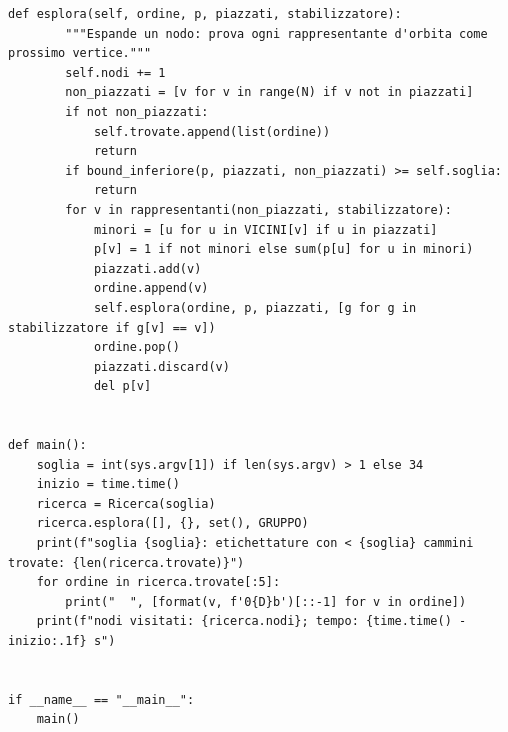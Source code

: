 \documentclass[11pt,a4paper]{article}
\begin{document}
\begin{lstlisting}[caption={attempt\_001 code\_2 [python, rigore exact] — Independent exact confirmation of the lower bound: symmetry-reduced branch-and-bound over  — verdetto del Referee: (nessun verdetto)}]
    def esplora(self, ordine, p, piazzati, stabilizzatore):
        """Espande un nodo: prova ogni rappresentante d'orbita come prossimo vertice."""
        self.nodi += 1
        non_piazzati = [v for v in range(N) if v not in piazzati]
        if not non_piazzati:
            self.trovate.append(list(ordine))
            return
        if bound_inferiore(p, piazzati, non_piazzati) >= self.soglia:
            return
        for v in rappresentanti(non_piazzati, stabilizzatore):
            minori = [u for u in VICINI[v] if u in piazzati]
            p[v] = 1 if not minori else sum(p[u] for u in minori)
            piazzati.add(v)
            ordine.append(v)
            self.esplora(ordine, p, piazzati, [g for g in stabilizzatore if g[v] == v])
            ordine.pop()
            piazzati.discard(v)
            del p[v]


def main():
    soglia = int(sys.argv[1]) if len(sys.argv) > 1 else 34
    inizio = time.time()
    ricerca = Ricerca(soglia)
    ricerca.esplora([], {}, set(), GRUPPO)
    print(f"soglia {soglia}: etichettature con < {soglia} cammini trovate: {len(ricerca.trovate)}")
    for ordine in ricerca.trovate[:5]:
        print("  ", [format(v, f'0{D}b')[::-1] for v in ordine])
    print(f"nodi visitati: {ricerca.nodi}; tempo: {time.time() - inizio:.1f} s")


if __name__ == "__main__":
    main()

\end{lstlisting}
\end{document}
